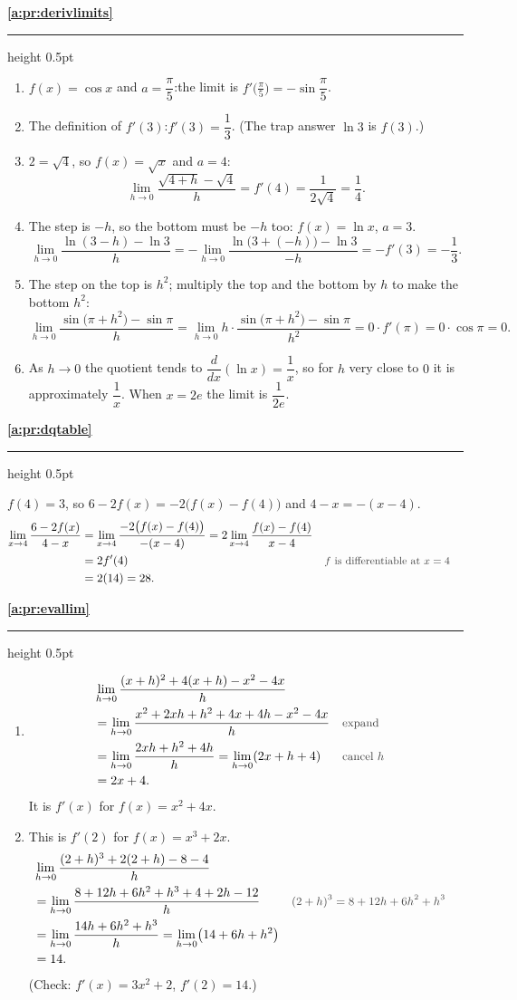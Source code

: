 \documentclass[11pt,a4paper]{article}
\newcommand{\solitem}[2]{%
 \par\addvspace{16pt}\Needspace{10\baselineskip}%
 {\large\bfseries \ref{#1}}\par\nobreak\vspace{2pt}%
 {\color{rulegray}\hrule height 0.5pt}\nobreak\vspace{7pt}%
 #2\par}
\newcommand{\why}[1]{\text{\small\color{darkgray}#1}}
\begin{document}
\solitem{a:pr:derivlimits}{%
\begin{enumerate}[label=(\alph*)]
 \item $f(x)=\cos x$ and $a=\dfrac{\pi}{5}$:\quad the limit is $f'\bigl(\frac{\pi}{5}\bigr)=-\sin\dfrac{\pi}{5}$.
 \item The definition of $f'(3)$:\quad $f'(3)=\dfrac13$. (The trap answer $\ln3$ is $f(3)$.)
 \item $2=\sqrt4$, so $f(x)=\sqrt x$ and $a=4$:
 \[
 \lim_{h\to0}\frac{\sqrt{4+h}-\sqrt4}{h}=f'(4)=\frac{1}{2\sqrt4}=\frac14.
 \]
 \item The step is $-h$, so the bottom must be $-h$ too: $f(x)=\ln x$, $a=3$.
 \[
 \lim_{h\to0}\frac{\ln(3-h)-\ln3}{h}=-\lim_{h\to0}\frac{\ln\bigl(3+(-h)\bigr)-\ln3}{-h}=-f'(3)=-\frac13.
 \]
 \item The step on the top is $h^2$; multiply the top and the bottom by $h$ to make the bottom $h^2$:
 \[
 \lim_{h\to0}\frac{\sin\bigl(\pi+h^2\bigr)-\sin\pi}{h}=\lim_{h\to0}h\cdot\frac{\sin\bigl(\pi+h^2\bigr)-\sin\pi}{h^2}=0\cdot f'(\pi)=0\cdot\cos\pi=0.
 \]
 \item As $h\to0$ the quotient tends to $\dfrac{d}{dx}(\ln x)=\dfrac1x$, so for $h$ very close to $0$ it is approximately $\dfrac1x$. When $x=2e$ the limit is $\dfrac{1}{2e}$.
\end{enumerate}
}

\solitem{a:pr:dqtable}{%
$f(4)=3$, so $6-2f(x)=-2\bigl(f(x)-f(4)\bigr)$ and $4-x=-(x-4)$.
\begin{align*}
\lim_{x\to4}\frac{6-2f(x)}{4-x}&=\lim_{x\to4}\frac{-2\bigl(f(x)-f(4)\bigr)}{-(x-4)}=2\lim_{x\to4}\frac{f(x)-f(4)}{x-4}\\
&=2f'(4) &&\why{$f$ is differentiable at $x=4$}\\
&=2(14)=28.
\end{align*}
}

\solitem{a:pr:evallim}{%
\begin{enumerate}[label=(\alph*)]
 \item
 \begin{align*}
 &\lim_{h\to0}\frac{(x+h)^2+4(x+h)-x^2-4x}{h}\\
 &=\lim_{h\to0}\frac{x^2+2xh+h^2+4x+4h-x^2-4x}{h} &&\why{expand}\\
 &=\lim_{h\to0}\frac{2xh+h^2+4h}{h}=\lim_{h\to0}(2x+h+4) &&\why{cancel $h$}\\
 &=2x+4.
 \end{align*}
 It is $f'(x)$ for $f(x)=x^2+4x$.
 \item This is $f'(2)$ for $f(x)=x^3+2x$.
 \begin{align*}
 &\lim_{h\to0}\frac{(2+h)^3+2(2+h)-8-4}{h}\\
 &=\lim_{h\to0}\frac{8+12h+6h^2+h^3+4+2h-12}{h} &&\why{$(2+h)^3=8+12h+6h^2+h^3$}\\
 &=\lim_{h\to0}\frac{14h+6h^2+h^3}{h}=\lim_{h\to0}\bigl(14+6h+h^2\bigr)\\
 &=14.
 \end{align*}
 (Check: $f'(x)=3x^2+2$, $f'(2)=14$.)
\end{enumerate}
}
\end{document}
